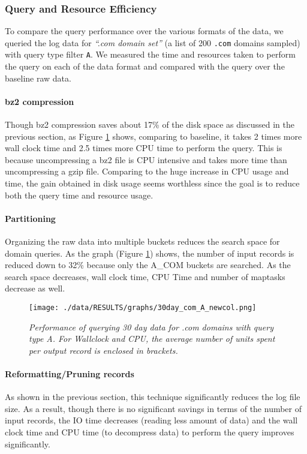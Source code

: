 \documentclass[11pt,a4paper]{article}
\begin{document}
\subsubsection{Query and Resource Efficiency}
To compare the query performance over the various formats of the data, we queried the log data for \textit{``.com domain set''} (a list of 200 \texttt{.com} domains sampled) with query type filter \texttt{A}. We measured the time and resources taken to perform the query on each of the data format and compared with the query over the baseline raw data.

\paragraph{bz2 compression}Though bz2 compression saves about 17\% of the disk space as discussed in the previous section, as Figure \ref{comafigure} shows, comparing to baseline, it takes 2 times more wall clock time and 2.5 times more CPU time to perform the query. This is because uncompressing a bz2 file is CPU intensive and takes more time than uncompressing a gzip file. Comparing to the huge increase in CPU usage and time, the gain obtained in disk usage seems worthless since the goal is to reduce both the query time and resource usage.

\paragraph{Partitioning} Organizing the raw data into multiple buckets reduces the search space for domain queries. As the graph (Figure \ref{comafigure}) shows, the number of input records is reduced down to 32\% because only the A\_COM buckets are searched. As the search space decreases, wall clock time, CPU Time and number of maptasks decrease as well.

\begin{figure}[H] 
\centering
\texttt{[image: ./data/RESULTS/graphs/30day\_com\_A\_newcol.png]}
\caption {\textit{Performance of querying 30 day data for .com domains with query type A. For Wallclock and CPU, the average number of units spent per output record is enclosed in brackets.}}
\label{comafigure}
\end{figure}

\paragraph{Reformatting/Pruning records} As shown in the previous section, this technique significantly reduces the log file size. As a result, though there is no significant savings in terms of the number of input records, the IO time decreases (reading less amount of data) and the wall clock time and CPU time (to decompress data) to perform the query improves significantly.
\end{document}
